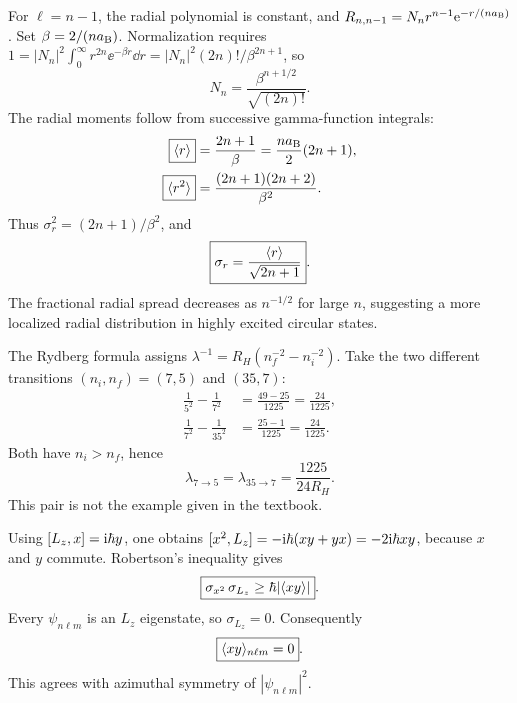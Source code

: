 For $\ell=n-1$, the radial polynomial
is constant, and
$R_{n,n-1}=N_n r^{n-1}\mathrm e^{-r/(na_{\mathrm B})}$.
Set $\beta=2/(na_{\mathrm B})$.
Normalization requires
$1=|N_n|^2\int_0^\infty r^{2n}
\ee^{-\beta r}\dd r=
|N_n|^2(2n)!/\beta^{2n+1}$, so
\begin{equation}
\boxed{N_n=\frac{\beta^{n+1/2}}{\sqrt{(2n)!}}}.
\end{equation}
The radial moments follow from successive
gamma-function integrals:
\begin{align}
\boxed{\langle r\rangle}&=\frac{2n+1}{\beta}
=\frac{na_{\mathrm B}}{2}(2n+1),\\
\boxed{\langle r^2\rangle}&=\frac{(2n+1)(2n+2)}{\beta^2}.
\end{align}
Thus
$\sigma_r^2=(2n+1)/\beta^2$,
and
\begin{equation}
\boxed{\sigma_r=\frac{\langle r\rangle}{\sqrt{2n+1}}}.
\end{equation}
The fractional radial spread decreases
as $n^{-1/2}$ for large $n$,
suggesting a more localized radial
distribution in highly excited circular states.

The Rydberg formula assigns
$\lambda^{-1}=R_H(n_f^{-2}-n_i^{-2})$.
Take the two different transitions
$(n_i,n_f)=(7,5)$ and $(35,7)$:
\begin{align}
\frac1{5^2}-\frac1{7^2}
&=\frac{49-25}{1225}=\frac{24}{1225},\\
\frac1{7^2}-\frac1{35^2}
&=\frac{25-1}{1225}=\frac{24}{1225}.
\end{align}
Both have $n_i>n_f$, hence
\begin{equation}
\boxed{\lambda_{7\to5}=\lambda_{35\to7}
=\frac{1225}{24R_H}}.
\end{equation}
This pair is not the example given
in the textbook.

Using $[L_z,x]=\mathrm i\hbar y$, one obtains
$[x^2,L_z]=-\mathrm i\hbar(xy+yx)
=-2\mathrm i\hbar xy$,
because $x$ and $y$ commute.
Robertson's inequality gives
\begin{equation}
\boxed{\sigma_{x^2}\,\sigma_{L_z}
\ge\hbar|\langle xy\rangle|}.
\end{equation}
Every $\psi_{n\ell m}$ is an $L_z$
eigenstate, so $\sigma_{L_z}=0$.
Consequently
\begin{equation}
\boxed{\langle xy\rangle_{n\ell m}=0}.
\end{equation}
This agrees with azimuthal symmetry
of $|\psi_{n\ell m}|^2$.

